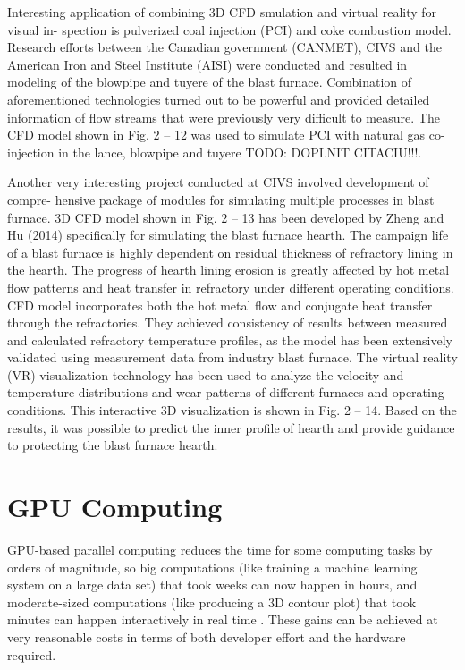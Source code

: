 Interesting application of combining 3D CFD smulation and virtual reality for visual in- spection is pulverized coal injection (PCI) and coke combustion model. Research efforts between the Canadian government (CANMET), CIVS and the American Iron and Steel Institute (AISI) were conducted and resulted in modeling of the blowpipe and tuyere of the blast furnace. Combination of aforementioned technologies turned out to be powerful and provided detailed information of flow streams that were previously very difficult to measure. The CFD model shown in Fig. 2 – 12 was used to simulate PCI with natural gas co-injection in the lance, blowpipe and tuyere TODO: DOPLNIT CITACIU!!!.

Another very interesting project conducted at CIVS involved development of compre- hensive package of modules for simulating multiple processes in blast furnace. 3D CFD model shown in Fig. 2 – 13 has been developed by Zheng and Hu (2014) specifically for simulating the blast furnace hearth. The campaign life of a blast furnace is highly dependent on residual thickness of refractory lining in the hearth. The progress of hearth lining erosion is greatly affected by hot metal flow patterns and heat transfer in refractory under different operating conditions. CFD model incorporates both the hot metal flow and conjugate heat transfer through the refractories. They achieved consistency of results between measured and calculated refractory temperature profiles, as the model has been extensively validated using measurement data from industry blast furnace. The virtual reality (VR) visualization technology has been used to analyze the velocity and temperature distributions and wear patterns of different furnaces and operating conditions. This interactive 3D visualization is shown in Fig. 2 – 14. Based on the results, it was possible to predict the inner profile of hearth and provide guidance to protecting the blast furnace hearth.



\section{GPU Computing}

\label{gpu-computing}

GPU-based parallel computing reduces the time for some computing tasks by orders of magnitude, so big computations (like training a machine learning system on a large data set) that took weeks can now happen in hours, and moderate-sized computations (like producing a 3D contour plot) that took minutes can happen interactively in real time \cite{stortiCudaForEngineers2015}. These gains can be achieved at very reasonable costs in terms of both developer effort and the hardware required.

